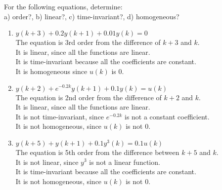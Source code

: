 \documentclass[12pt]{article}
\newenvironment{problem}[2][Problem]{\begin{trivlist}
\item[\hskip \labelsep {\bfseries #1}\hskip \labelsep {\bfseries #2.}]}{\end{trivlist}}
\begin{document}
\begin{problem}{2}
    For the following equations, determine:\\
    a) order?, b) linear?, c) time-invariant?, d) homogeneous?
    \begin{enumerate}[label=\roman*]
        \item $y(k+3) + 0.2y(k+1) + 0.01y(k)=0$\\
        The equation is 3rd order from the difference of $k+3$ and $k$.\\
        It is linear, since all the functions are linear.\\
        It is time-invariant because all the coefficients are constant.\\
        It is homogeneous since $u(k)$ is 0.
        \item $y(k+2) + e^{-0.2k}y(k+1) + 0.1y(k) = u(k)$\\
        The equation is 2nd order from the difference of $k+2$ and $k$.\\
        It is linear, since all the functions are linear.\\
        It is not time-invariant, since $e^{-0.2k}$ is not a constant coefficient.\\
        It is not homogeneous, since $u(k)$ is not 0.
        \item $y(k+5) + y(k+1) + 0.1y^3(k)=0.1u(k)$\\
        The equation is 5th order from the difference between $k+5$ and $k$.\\
        It is not linear, since $y^3$ is not a linear function.\\
        It is time-invariant because all the coefficients are constant.\\
        It is not homogeneous, since $u(k)$ is not 0.
    \end{enumerate}
\end{problem}
\pagebreak
\end{document}
